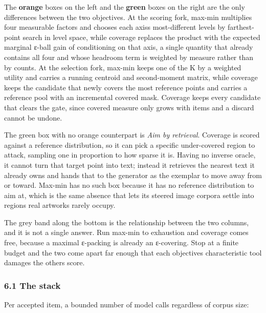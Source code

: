 \documentclass[
  10pt,
]{article}
\theoremstyle{plain}
\theoremstyle{definition}
\begin{document}
The \textbf{orange} boxes on the left and the \textbf{green} boxes on
the right are the only differences between the two objectives. At the
scoring fork, max-min multiplies four measurable factors and chooses
each axis\textquotesingle s most-different levels by farthest-point
search in level space, while coverage replaces the product with the
expected marginal ε-ball gain of conditioning on that axis, a single
quantity that already contains all four and whose headroom term is
weighted by measure rather than by counts. At the selection fork,
max-min keeps one of the K by a weighted utility and carries a running
centroid and second-moment matrix, while coverage keeps the candidate
that newly covers the most reference points and carries a reference pool
with an incremental covered mask. Coverage keeps every candidate that
clears the gate, since covered measure only grows with items and a
discard cannot be undone.

The green box with no orange counterpart is \emph{Aim by retrieval}.
Coverage is scored against a reference distribution, so it can pick a
specific under-covered region to attack, sampling one in proportion to
how sparse it is. Having no inverse oracle, it cannot turn that target
point into text; instead it retrieves the nearest text it already owns
and hands that to the generator as the exemplar to move away from or
toward. Max-min has no such box because it has no reference distribution
to aim at, which is the same absence that lets its steered image corpora
settle into regions real artworks rarely occupy.

The grey band along the bottom is the relationship between the two
columns, and it is not a single answer. Run max-min to exhaustion and
coverage comes free, because a maximal ε-packing is already an
ε-covering. Stop at a finite budget and the two come apart far enough
that each objective\textquotesingle s characteristic tool damages the
other\textquotesingle s score.

\subsubsection{6.1 The stack}\label{61-the-stack}

Per accepted item, a bounded number of model calls regardless of corpus
size:
\end{document}
